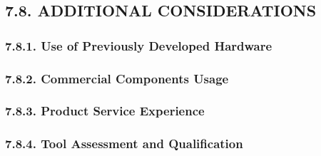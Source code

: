 \documentclass[
]{article}
\begin{document}
\hypertarget{additional-considerations}{%
\subsection{7.8. ADDITIONAL
CONSIDERATIONS}\label{additional-considerations}}

\hypertarget{use-of-previously-developed-hardware}{%
\subsubsection{7.8.1. Use of Previously Developed
Hardware}\label{use-of-previously-developed-hardware}}

\hypertarget{commercial-components-usage}{%
\subsubsection{7.8.2. Commercial Components
Usage}\label{commercial-components-usage}}

\hypertarget{product-service-experience}{%
\subsubsection{7.8.3. Product Service
Experience}\label{product-service-experience}}

\hypertarget{tool-assessment-and-qualification}{%
\subsubsection{7.8.4. Tool Assessment and
Qualification}\label{tool-assessment-and-qualification}}
\end{document}
